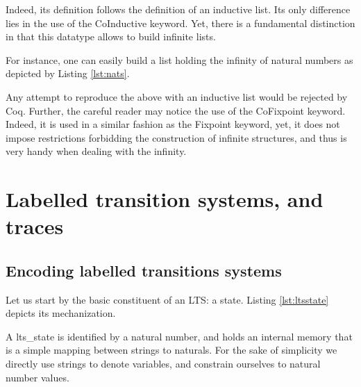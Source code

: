 				
	
	\noindent Indeed, its definition follows the definition of an inductive list.	
	Its only difference lies in the use of the \textsf{CoInductive} keyword.
	Yet, there is a fundamental distinction in that this datatype allows to build
	infinite lists.
	
		For instance, one can easily build a list holding the infinity of natural numbers as
	depicted by Listing \ref{lst:nats}.
	
	
					
	
	\noindent Any attempt to reproduce the above with an inductive list would be rejected by
	Coq. Further, the careful reader may notice the use of the \textsf{CoFixpoint} keyword. Indeed,
	it is used in a similar fashion as the \textsf{Fixpoint} keyword, yet, it does not impose
	restrictions forbidding the construction of infinite structures, and thus is very handy when dealing
	with the infinity.



\section{Labelled transition systems, and traces}
\label{sec:pLTS}

\subsection{Encoding labelled transitions systems}
\label{sub:lts}
	
	Let us start by the basic constituent of an \ac{LTS}: a state. Listing \ref{lst:ltsstate} depicts
	its mechanization.	
	
		
	
	
	\noindent A \textsf{lts\_state} is identified by a natural number, and holds an internal memory that is a
	simple mapping between strings to naturals. For the sake of simplicity we directly use strings to denote variables,
	and constrain ourselves to natural number values.
	
